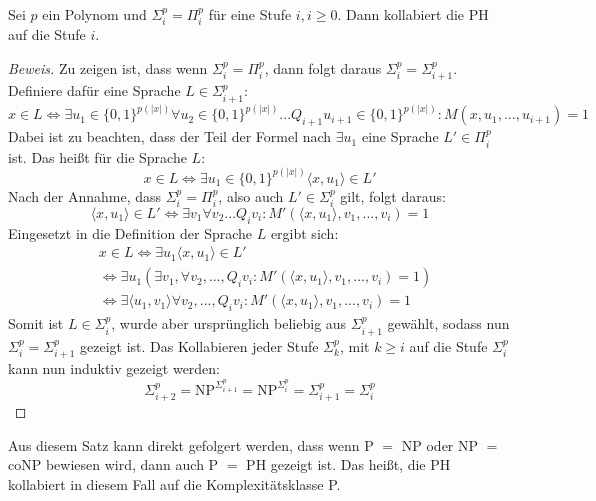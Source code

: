 \begin{theorem}
    Sei $p$ ein Polynom und $\Sigma^p_i = \Pi^p_i$ für eine Stufe $i, i \geq 0$. Dann kollabiert die PH auf die Stufe $i$.
\end{theorem}

\begin{proof}[Beweis] \cite[S.224-225]{rothe_komplexitatstheorie_2008}
    Zu zeigen ist, dass wenn $\Sigma^p_i = \Pi^p_i$, dann folgt daraus $\Sigma^p_i = \Sigma^p_{i+1}$.
    Definiere dafür eine Sprache $L \in \Sigma^p_{i+1}$:
    \begin{equation}
    x \in L \Leftrightarrow \exists u_1 \in \{0,1\}^{p(|x|)} \forall u_2 \in \{0,1\}^{p(|x|)} ... Q_{i+1}u_{i + 1} \in \{0,1\}^{p(|x|)} : M(x, u_1, ..., u_{i+1}) = 1
    \end{equation}
    Dabei ist zu beachten, dass der Teil der Formel nach $\exists u_1$ eine Sprache $L' \in \Pi^p_i$ ist.
    Das heißt für die Sprache $L$:
    \begin{equation}
    x \in L \Leftrightarrow \exists u_1 \in \{0,1\}^{p(|x|)} \langle x, u_1 \rangle \in L'
    \end{equation}
    Nach der Annahme, dass $\Sigma^p_i = \Pi^p_i$, also auch $L' \in \Sigma^p_i$ gilt, folgt daraus:
    \begin{equation}
    \langle x, u_1 \rangle \in L' \Leftrightarrow \exists v_1 \forall v_2 ... Q_i v_i : M'(\langle x, u_1 \rangle, v_1, ..., v_i) = 1 
    \end{equation}
    Eingesetzt in die Definition der Sprache $L$ ergibt sich:
    \begin{align}
    & x \in L \Leftrightarrow \exists u_1 \langle x, u_1 \rangle \in L' \\
    & \Leftrightarrow \exists u_1 (\exists v_1, \forall v_2, ..., Q_i v_i :  M'(\langle x, u_1 \rangle, v_1, ..., v_i) = 1) \\
    & \Leftrightarrow \exists \langle u_1, v_1 \rangle \forall v_2, ..., Q_i v_i : M'(\langle x, u_1 \rangle, v_1, ..., v_i) = 1
    \end{align}
    Somit ist $L \in \Sigma^p_i$, wurde aber ursprünglich beliebig aus $\Sigma^p_{i+1}$ gewählt, sodass nun $\Sigma^p_i = \Sigma^p_{i+1}$ gezeigt ist.
    Das Kollabieren jeder Stufe $\Sigma^p_k$, mit $k \geq i$ auf die Stufe $\Sigma^p_i$ kann nun induktiv gezeigt werden:
    \begin{equation}
        \Sigma^p_{i+2} = \text{NP}^{\Sigma^p_{i+1}} = \text{NP}^{\Sigma^p_i} = \Sigma^p_{i+1} = \Sigma^p_i
    \end{equation}
\end{proof}
Aus diesem Satz kann direkt gefolgert werden, dass wenn P $=$ NP oder NP $=$ coNP bewiesen wird, dann auch P $=$ PH gezeigt ist. Das heißt, die PH kollabiert in diesem Fall auf die Komplexitätsklasse P.

